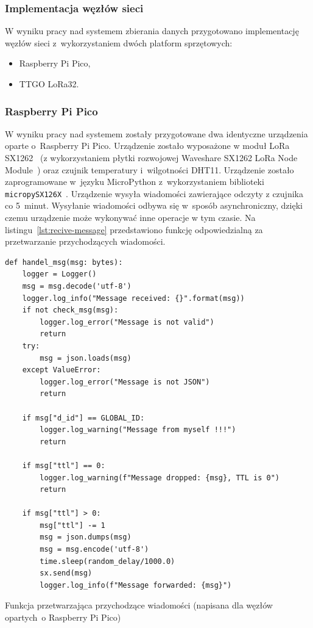\subsubsection{Implementacja węzłów sieci}
W wyniku pracy nad systemem zbierania danych przygotowano implementację węzłów sieci z~wykorzystaniem dwóch platform sprzętowych:

\begin{itemize}
    \item Raspberry Pi Pico,
    \item TTGO LoRa32.
\end{itemize}

\subsubsection{Raspberry Pi Pico}

W wyniku pracy nad systemem zostały przygotowane dwa identyczne urządzenia oparte o~Raspberry Pi Pico.
Urządzenie zostało wyposażone w moduł LoRa SX1262~\cite{PICO:sx1262-doc} (z wykorzystaniem płytki rozwojowej Waveshare SX1262 LoRa Node Module~\cite{PICO:waveshare-doc}) oraz czujnik temperatury i~wilgotności DHT11.
Urządzenie zostało zaprogramowane w~języku MicroPython z~wykorzystaniem biblioteki \texttt{micropySX126X}~\cite{PICO:lora-lib}.
Urządzenie wysyła wiadomości zawierające odczyty z czujnika co 5~minut.
Wysyłanie wiadomości odbywa się w~sposób asynchroniczny, dzięki czemu urządzenie może wykonywać inne operacje w tym czasie. Na listingu~\ref{lst:recive-message} przedstawiono funkcję odpowiedzialną za przetwarzanie przychodzących wiadomości.

\begin{lstfloat}[h!]
    \lstset{language=Python}
    \begin{lstlisting}[frame=single]
def handel_msg(msg: bytes):
    logger = Logger()
    msg = msg.decode('utf-8')
    logger.log_info("Message received: {}".format(msg))
    if not check_msg(msg):
        logger.log_error("Message is not valid")
        return
    try:
        msg = json.loads(msg)
    except ValueError:
        logger.log_error("Message is not JSON")
        return

    if msg["d_id"] == GLOBAL_ID:
        logger.log_warning("Message from myself !!!")
        return

    if msg["ttl"] == 0:
        logger.log_warning(f"Message dropped: {msg}, TTL is 0")
        return

    if msg["ttl"] > 0:
        msg["ttl"] -= 1
        msg = json.dumps(msg)
        msg = msg.encode('utf-8')
        time.sleep(random_delay/1000.0)
        sx.send(msg)
        logger.log_info(f"Message forwarded: {msg}")    
\end{lstlisting}
    \caption{Funkcja przetwarzająca przychodzące wiadomości (napisana dla węzłów opartych~o Raspberry Pi Pico)}\label{lst:recive-message}
\end{lstfloat}

